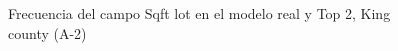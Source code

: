 \begin{figure}[H]
    \centering
    
    \caption{Frecuencia del campo Sqft lot en el modelo real y Top 2, King county (A-2)}
    \label{frecuency-top2-sqft lot}
\end{figure}